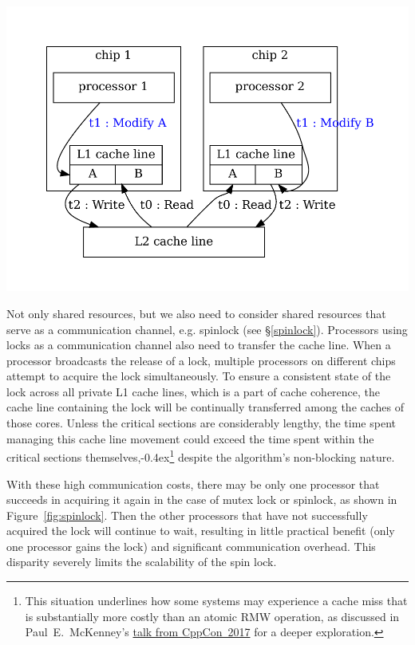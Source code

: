 \documentclass[fontsize=10pt, oneside]{scrartcl}
\newcommand{\punckern}{\kern-0.4ex}
\newcommand{\fig}[1]{Figure~\ref{#1}}
\newcommand{\secref}[1]{\hyperref[#1]{\textsc{\S}\ref*{#1}}}
\begin{document}
\includegraphics[keepaspectratio, width=0.6\linewidth]{images/false-sharing}
\label{fig:false-sharing}

Not only shared resources, 
but we also need to consider shared resources that serve as a communication channel, e.g. spinlock (see \secref{spinlock}). 
Processors using locks as a communication channel also need to transfer the cache line.
When a processor broadcasts the release of a lock, 
multiple processors on different chips attempt to acquire the lock simultaneously. 
To ensure a consistent state of the lock across all private L1 cache lines, 
which is a part of cache coherence, 
the cache line containing the lock will be continually transferred among the caches of those cores.
Unless the critical sections are considerably lengthy, 
the time spent managing this cache line movement could exceed the time spent within the critical sections themselves,\punckern\footnote{%
This situation underlines how some systems may experience a cache miss that is substantially more costly than an atomic \textsc{RMW} operation,
as discussed in Paul~E.\ McKenney's
\href{https://www.youtube.com/watch?v=74QjNwYAJ7M}{talk from CppCon~2017}
for a deeper exploration.}
despite the algorithm's non-blocking nature.

With these high communication costs, there may be only one processor that succeeds in acquiring it again in the case of mutex lock or spinlock, as shown in \fig{fig:spinlock}. 
Then the other processors that have not successfully acquired the lock will continue to wait, 
resulting in little practical benefit (only one processor gains the lock) and significant communication overhead. 
This disparity severely limits the scalability of the spin lock.
\end{document}
